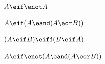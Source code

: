 \begin{compactlist}
\item  $A \eif \enot A$ \vspace{.5ex}							

%
\item $A \eif (A \eand (A \eor B))$ \vspace{.5ex}	

%

\item $(A \eif B) \eiff (B \eif A)$ 	\vspace{.5ex}				%
%
%
%

\item $A \eif \enot(A \eand (A \eor B)) $	\vspace{.5ex}	

%
%
%


\end{compactlist}

